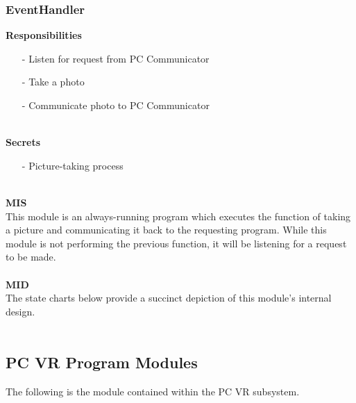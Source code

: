 \documentclass[titlepage]{article}
\begin{document}
\subsubsection{EventHandler}
\textbf{Responsibilities}
\begin{itemize}
	\item[-] Listen for request from PC Communicator
	\item[-] Take a photo
	\item[-] Communicate photo to PC Communicator
\end{itemize}~\\
\textbf{Secrets}
\begin{itemize}
	\item[-] Picture-taking process
\end{itemize}~\\
\textbf{MIS}\\[2mm]
This module is an always-running program which executes the function of taking a picture and communicating it back to the requesting program. While this module is not performing the previous function, it will be listening for a request to be made.
\\\\
\textbf{MID}\\[2mm]
The state charts below provide a succinct depiction of this module's internal design.
\\\\
\subsection{PC VR Program Modules}
The following is the module contained within the PC VR subsystem.
\end{document}
